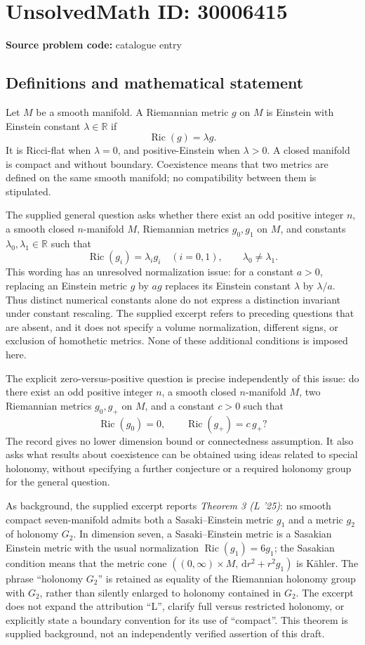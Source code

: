 \documentclass[11pt]{article}
\newcommand{\R}{\mathbb{R}}
\newcommand{\dd}{\,\mathrm{d}}
\begin{document}
\section*{UnsolvedMath ID: 30006415}
\textbf{Source problem code:} catalogue entry
\subsection{Definitions and mathematical statement}
Let \(M\) be a smooth manifold. A Riemannian metric \(g\) on \(M\) is Einstein with Einstein constant \(\lambda\in\R\) if
\[
\operatorname{Ric}(g)=\lambda g.
\]
It is Ricci-flat when \(\lambda=0\), and positive-Einstein when \(\lambda>0\). A closed manifold is compact and without boundary. Coexistence means that two metrics are defined on the same smooth manifold; no compatibility between them is stipulated.

The supplied general question asks whether there exist an odd positive integer \(n\), a smooth closed \(n\)-manifold \(M\), Riemannian metrics \(g_0,g_1\) on \(M\), and constants \(\lambda_0,\lambda_1\in\R\) such that
\[
\operatorname{Ric}(g_i)=\lambda_i g_i\quad(i=0,1),
\qquad \lambda_0\ne\lambda_1.
\]
This wording has an unresolved normalization issue: for a constant \(a>0\), replacing an Einstein metric \(g\) by \(ag\) replaces its Einstein constant \(\lambda\) by \(\lambda/a\). Thus distinct numerical constants alone do not express a distinction invariant under constant rescaling. The supplied excerpt refers to preceding questions that are absent, and it does not specify a volume normalization, different signs, or exclusion of homothetic metrics. None of these additional conditions is imposed here.

The explicit zero-versus-positive question is precise independently of this issue: do there exist an odd positive integer \(n\), a smooth closed \(n\)-manifold \(M\), two Riemannian metrics \(g_0,g_+\) on \(M\), and a constant \(c>0\) such that
\[
\operatorname{Ric}(g_0)=0,
\qquad
\operatorname{Ric}(g_+)=c\,g_+?
\]
The record gives no lower dimension bound or connectedness assumption. It also asks what results about coexistence can be obtained using ideas related to special holonomy, without specifying a further conjecture or a required holonomy group for the general question.

As background, the supplied excerpt reports \emph{Theorem 3 (L '25)}: no smooth compact seven-manifold admits both a Sasaki--Einstein metric \(g_1\) and a metric \(g_2\) of holonomy \(G_2\). In dimension seven, a Sasaki--Einstein metric is a Sasakian Einstein metric with the usual normalization \(\operatorname{Ric}(g_1)=6g_1\); the Sasakian condition means that the metric cone \(((0,\infty)\times M,\dd r^2+r^2g_1)\) is K\"ahler. The phrase ``holonomy \(G_2\)'' is retained as equality of the Riemannian holonomy group with \(G_2\), rather than silently enlarged to holonomy contained in \(G_2\). The excerpt does not expand the attribution ``L'', clarify full versus restricted holonomy, or explicitly state a boundary convention for its use of ``compact''. This theorem is supplied background, not an independently verified assertion of this draft.
\end{document}
